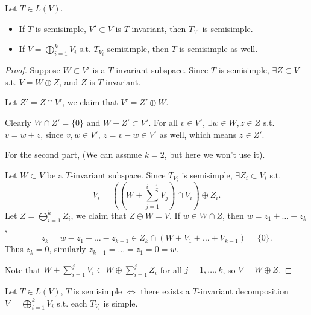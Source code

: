 \begin{lemma}
	Let $T\in L(V)$.
	\begin{itemize}
		\item If $T$ is semisimple,
			$V' \subset V$ is $T$-invariant, then $T_{V'}$ is semisimple.
		\item If $V = \bigoplus_{i=1}^k V_i$ s.t. $T_{V_i}$ semisimple,
			then $T$ is semisimple as well.
	\end{itemize}
\end{lemma}
\begin{proof}[Proof]
    Suppose $W \subset V'$ is a $T$-invariant subspace.
	Since $T$ is semisimple, $\exists Z \subset V$ s.t. $V = W \oplus Z$,
	and $Z$ is $T$-invariant.

	Let $Z' = Z \cap V'$, we claim that $V' = Z' \oplus W$.

	Clearly $W\cap Z' = \{0\}$ and $W + Z' \subset V'$.
	For all $v\in V'$, $\exists w\in W, z\in Z$ s.t. $v = w + z$,
	since $v, w\in V'$, $z = v - w \in V'$ as well, which means $z\in Z'$.

	For the second part, (We can assmue $k = 2$, but here we won't use it).

	Let $W \subset V$ be a $T$-invariant subspace.
	Since $T_{V_i}$ is semisimple, $\exists Z_i \subset V_i$ s.t.
	\[
		V_i = \left(\left(W + \sum_{j=1}^{i-1} V_j\right)\cap V_i\right)
		\oplus Z_i.
	\]
	Let $Z = \bigoplus_{i=1}^k Z_i$, we claim that $Z \oplus W = V$.
	If $w\in W\cap Z$, then $w = z_1+ \dots + z_k$,
	\[
	z_k = w - z_1 - \dots - z_{k-1}\in Z_k\cap (W + V_1 + \dots + V_{k-1})
	= \{0\}.
	\]
	Thus $z_k = 0$, similarly $z_{k-1} = \dots = z_1 = 0 = w$.

	Note that $W + \sum_{i=1}^{j} V_i \subset W \oplus \sum_{i=1}^{j} Z_i$
	for all $j = 1, \dots, k$, so $V = W \oplus Z$.
\end{proof}

\begin{corollary}
	Let $T\in L(V)$, $T$ is semisimple $\iff$ there exists
	a $T$-invariant decomposition $V = \bigoplus_{i=1}^k V_i$
	s.t. each $T_{V_i}$ is simple.
\end{corollary}

